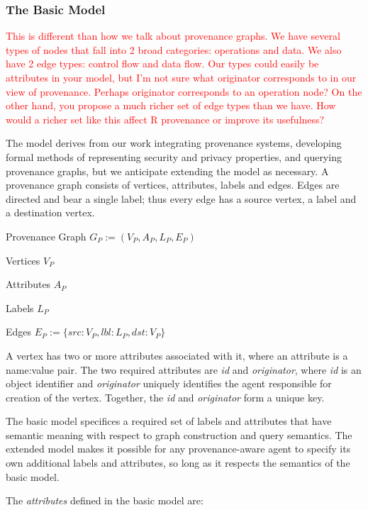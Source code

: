 \documentclass[10pt]{article}
\newenvironment{itemize_packed}{
\begin{itemize}
  \setlength{\itemsep}{1pt}
  \setlength{\parskip}{0pt}
  \setlength{\parsep}{0pt}
}{\end{itemize}}
\newcommand{\todo}[1]{\textcolor{red}{#1}}
\begin{document}
\subsubsection{The Basic Model}

\todo{This is different than how we talk about provenance graphs.  We have
several types of nodes that fall into 2 broad categories:  operations and data.  
We also have 2 edge types: control flow and data flow.  Our types could easily
be attributes in your model, but I'm not sure what originator corresponds to in
our view of provenance.  Perhaps originator corresponds to an operation node?  
On the other hand, you propose a much richer set of edge types than we have.
How would a richer set like this affect R provenance or improve its usefulness?}

The model derives from our work integrating provenance
systems, developing formal methods of representing security and privacy
properties, and querying provenance graphs, but we anticipate
extending the model as necessary.
A provenance graph consists of vertices, attributes, labels and edges.
Edges are directed and bear a single label;
thus every edge has a source vertex, a label and a destination vertex.

Provenance Graph $G_P := (V_P, A_P, L_P, E_P)$
\begin{itemize_packed}
\item Vertices $V_P$
\item Attributes $A_P$
\item Labels $L_P$
\item Edges $E_P := \{src:V_P, lbl:L_P, dst:V_P\}$
\end{itemize_packed}

A vertex has two or more attributes associated with it, where an
attribute is a name:value pair.
The two required attributes are \emph{id} and \emph{originator},
where \emph{id} is an object identifier and \emph{originator} uniquely
identifies the agent responsible for creation of the vertex.
Together, the \emph{id} and \emph{originator} form a unique key.

The basic model specifices a required set of labels and attributes that have
semantic meaning with respect to graph construction and query
semantics. The extended model makes it possible for any provenance-aware
agent to specify its own additional labels and attributes, so long as it
respects the semantics of the basic model.

The \emph{attributes} defined in the basic model are:
\end{document}

